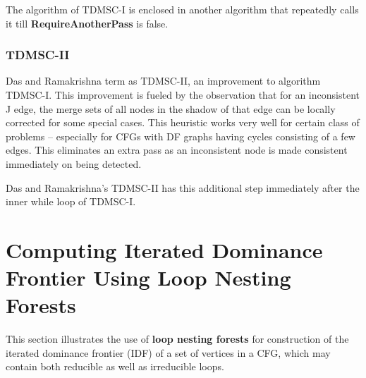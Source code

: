 The algorithm of TDMSC-I is enclosed in another algorithm that repeatedly
calls it till {\bf RequireAnotherPass} is false.


\subsubsection{TDMSC-II}

Das and Ramakrishna term as TDMSC-II, an improvement to algorithm
TDMSC-I. This improvement is fueled by the observation that for an
inconsistent J edge, the merge sets of all nodes in the shadow
of that edge can be locally corrected for some special cases. This
heuristic works very well for certain class of problems -- especially
for CFGs with DF graphs having cycles consisting of a few edges. This
eliminates an extra pass as an inconsistent node is made consistent
immediately on being detected. 

Das and Ramakrishna's TDMSC-II has this additional step immediately
after the inner while loop of TDMSC-I.


%



\section{Computing Iterated Dominance Frontier Using Loop Nesting Forests}
    This section illustrates the use of {\bf loop nesting forests} for construction of the iterated
    dominance frontier (IDF) of a set of vertices in a CFG, which may contain both reducible as well as
    irreducible loops.

